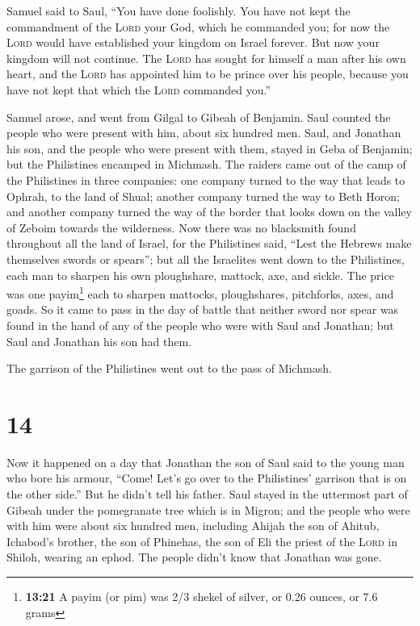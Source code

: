  Samuel said to Saul, ``You have done foolishly. You have
not kept the commandment of the \textsc{Lord} your God, which he
commanded you; for now the \textsc{Lord} would have established your
kingdom on Israel forever.  But now your kingdom will not
continue. The \textsc{Lord} has sought for himself a man after his own
heart, and the \textsc{Lord} has appointed him to be prince over his
people, because you have not kept that which the \textsc{Lord} commanded
you.''

 Samuel arose, and went from Gilgal to Gibeah of
Benjamin. Saul counted the people who were present with him, about six
hundred men.  Saul, and Jonathan his son, and the people
who were present with them, stayed in Geba of Benjamin; but the
Philistines encamped in Michmash.  The raiders came out
of the camp of the Philistines in three companies: one company turned to
the way that leads to Ophrah, to the land of Shual; 
another company turned the way to Beth Horon; and another company turned
the way of the border that looks down on the valley of Zeboim towards
the wilderness.  Now there was no blacksmith found
throughout all the land of Israel, for the Philistines said, ``Lest the
Hebrews make themselves swords or spears'';  but all the
Israelites went down to the Philistines, each man to sharpen his own
ploughshare, mattock, axe, and sickle.  The price was one
payim\footnote{\textbf{13:21} A payim (or pim) was 2/3 shekel of silver,
  or 0.26 ounces, or 7.6 grams} each to sharpen mattocks, ploughshares,
pitchforks, axes, and goads.  So it came to pass in the
day of battle that neither sword nor spear was found in the hand of any
of the people who were with Saul and Jonathan; but Saul and Jonathan his
son had them.

 The garrison of the Philistines went out to the pass of
Michmash.

\hypertarget{section-13}{%
\section{14}\label{section-13}}

 Now it happened on a day that Jonathan the son of Saul
said to the young man who bore his armour, ``Come! Let's go over to the
Philistines' garrison that is on the other side.'' But he didn't tell
his father.  Saul stayed in the uttermost part of Gibeah
under the pomegranate tree which is in Migron; and the people who were
with him were about six hundred men,  including Ahijah the
son of Ahitub, Ichabod's brother, the son of Phinehas, the son of Eli
the priest of the \textsc{Lord} in Shiloh, wearing an ephod. The people
didn't know that Jonathan was gone.

